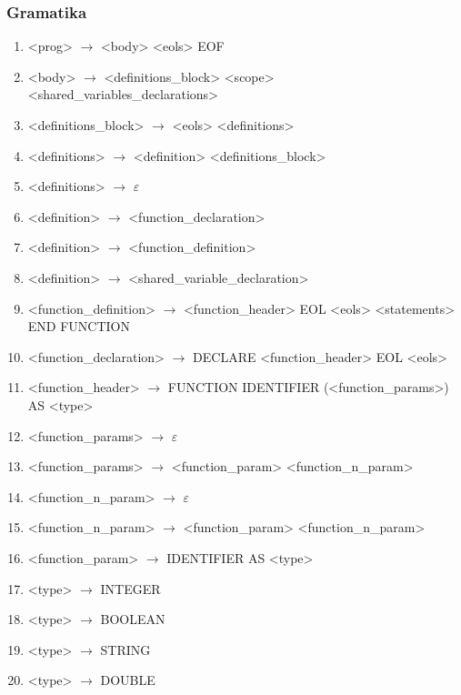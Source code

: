 \subsubsection{Gramatika}
\begin{normalsize}
    \begin{enumerate}
        \item <prog> $\rightarrow$ <body> <eols> EOF
        \item <body> $\rightarrow$ <definitions\_block> <scope> <shared\_variables\_declarations>

        \item <definitions\_block> $\rightarrow$ <eols> <definitions>

        \item <definitions> $\rightarrow$ <definition> <definitions\_block>
        \item <definitions> $\rightarrow$ $\varepsilon$

        \item <definition> $\rightarrow$ <function\_declaration>
        \item <definition> $\rightarrow$ <function\_definition>
        \item <definition> $\rightarrow$ <shared\_variable\_declaration>

        \item <function\_definition> $\rightarrow$ <function\_header> EOL <eols> <statements> END FUNCTION
        \item <function\_declaration> $\rightarrow$ DECLARE <function\_header> EOL <eols>

        \item <function\_header> $\rightarrow$ FUNCTION IDENTIFIER (<function\_params>) AS <type>

        \item <function\_params> $\rightarrow$ $\varepsilon$
        \item <function\_params> $\rightarrow$ <function\_param> <function\_n\_param>

        \item <function\_n\_param> $\rightarrow$ $\varepsilon$
        \item <function\_n\_param> $\rightarrow$ <function\_param> <function\_n\_param>

        \item <function\_param> $\rightarrow$ IDENTIFIER AS <type>


        \item <type> $\rightarrow$ INTEGER
        \item <type> $\rightarrow$ BOOLEAN
        \item <type> $\rightarrow$ STRING
        \item <type> $\rightarrow$ DOUBLE


\end{enumerate}
\end{normalsize}
